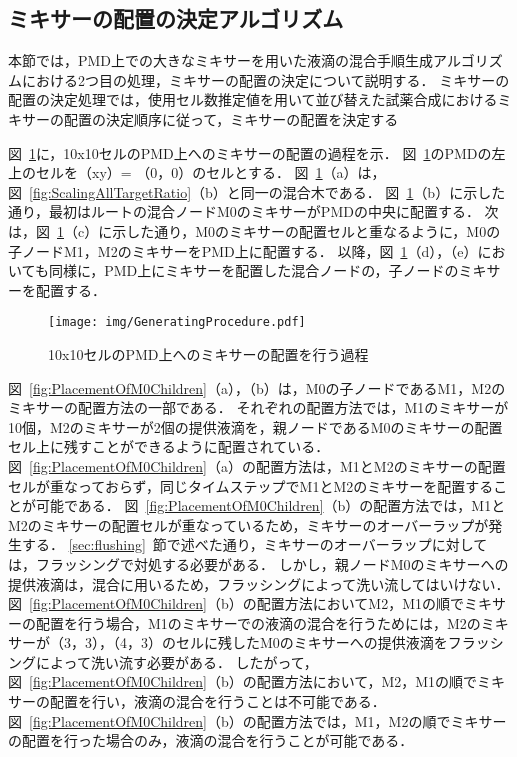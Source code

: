 \newpage

\subsection{ミキサーの配置の決定アルゴリズム}
本節では，PMD上での大きなミキサーを用いた液滴の混合手順生成アルゴリズムにおける2つ目の処理，ミキサーの配置の決定について説明する．
ミキサーの配置の決定処理では，使用セル数推定値を用いて並び替えた試薬合成におけるミキサーの配置の決定順序に従って，ミキサーの配置を決定する

図~\ref{fig:GeneratingProcedure}に，10x10セルのPMD上へのミキサーの配置の過程を示．
図~\ref{fig:GeneratingProcedure}のPMDの左上のセルを（xy）= （0，0）のセルとする．
図~\ref{fig:GeneratingProcedure}（a）は，図~\ref{fig:ScalingAllTargetRatio}（b）と同一の混合木である．
図~\ref{fig:GeneratingProcedure}（b）に示した通り，最初はルートの混合ノードM0のミキサーがPMDの中央に配置する．
次は，図~\ref{fig:GeneratingProcedure}（c）に示した通り，M0のミキサーの配置セルと重なるように，M0の子ノードM1，M2のミキサーをPMD上に配置する．
以降，図~\ref{fig:GeneratingProcedure}（d），（e）においても同様に，PMD上にミキサーを配置した混合ノードの，子ノードのミキサーを配置する．

\begin{figure}[tbp]
    \centering\texttt{[image: img/GeneratingProcedure.pdf]}
 \caption{10x10セルのPMD上へのミキサーの配置を行う過程}\label{fig:GeneratingProcedure}
\end{figure}

図~\ref{fig:PlacementOfM0Children}（a），（b）は，M0の子ノードであるM1，M2のミキサーの配置方法の一部である．
それぞれの配置方法では，M1のミキサーが10個，M2のミキサーが2個の提供液滴を，親ノードであるM0のミキサーの配置セル上に残すことができるように配置されている．
図~\ref{fig:PlacementOfM0Children}（a）の配置方法は，M1とM2のミキサーの配置セルが重なっておらず，同じタイムステップでM1とM2のミキサーを配置することが可能である．
図~\ref{fig:PlacementOfM0Children}（b）の配置方法では，M1とM2のミキサーの配置セルが重なっているため，ミキサーのオーバーラップが発生する．
\ref{sec:flushing}~節で述べた通り，ミキサーのオーバーラップに対しては，フラッシングで対処する必要がある．
しかし，親ノードM0のミキサーへの提供液滴は，混合に用いるため，フラッシングによって洗い流してはいけない．
図~\ref{fig:PlacementOfM0Children}（b）の配置方法においてM2，M1の順でミキサーの配置を行う場合，M1のミキサーでの液滴の混合を行うためには，M2のミキサーが（3，3），（4，3）のセルに残したM0のミキサーへの提供液滴をフラッシングによって洗い流す必要がある．
したがって，図~\ref{fig:PlacementOfM0Children}（b）の配置方法において，M2，M1の順でミキサーの配置を行い，液滴の混合を行うことは不可能である．
図~\ref{fig:PlacementOfM0Children}（b）の配置方法では，M1，M2の順でミキサーの配置を行った場合のみ，液滴の混合を行うことが可能である．

